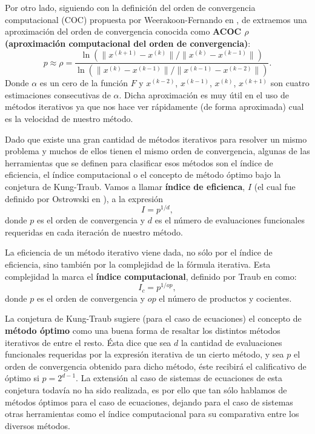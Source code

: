 Por otro lado, siguiendo con la definición del orden de convergencia computacional (COC) propuesta por Weerakoon-Fernando en \cite{weerakoon}, de \cite{CT} extraemos una aproximación del orden de convergencia conocida como \textbf{ACOC $\rho$ (aproximación computacional del orden de convergencia)}:
\begin{equation}\label{acoc}
p \approx \rho = \frac{\ln{(\|x^{(k+1)}-x^{(k)}\|/\|x^{(k)}-x^{(k-1)}\|)}}{\ln{(\|x^{(k)}-x^{(k-1)}\|/\|x^{(k-1)}-x^{(k-2)}\|)}}.
\end{equation}
Donde $\alpha$ es un cero de la función $F$ y $x^{(k-2)}$, $x^{(k-1)}$, $x^{(k)}$, $x^{(k+1)}$ son cuatro estimaciones consecutivas de $\alpha$. Dicha aproximación es muy útil en el uso de métodos iterativos ya que nos hace ver rápidamente (de forma aproximada) cual es la velocidad de nuestro método.

Dado que existe una gran cantidad de métodos iterativos para resolver un mismo problema y muchos de ellos tienen el mismo orden de convergencia, algunas de las herramientas que se definen para clasificar esos métodos son el índice de eficiencia, el índice computacional o el concepto de método óptimo bajo la conjetura de Kung-Traub. Vamos a llamar \textbf{índice de eficienca}, $I$ (el cual fue definido por Ostrowski en \cite{ostrowski}), a la expresión
\begin{equation}
I=p^{1/d},
\end{equation}
donde $p$ es el orden de convergencia y $d$ es el número de evaluaciones funcionales requeridas en cada iteración de nuestro método. 

La eficiencia de un método iterativo viene dada, no sólo por el índice de eficiencia, sino también por la complejidad de la fórmula iterativa. Esta complejidad la marca el \textbf{índice computacional}, definido por Traub en \cite{TR} como:
\begin{equation}
I_c=p^{1/op},
\end{equation}
donde $p$ es el orden de convergencia y $op$ el número de productos y cocientes.

La conjetura de Kung-Traub \cite{KT} sugiere (para el caso de ecuaciones) el concepto de \textbf{método óptimo} como una buena forma de resaltar los distintos métodos iterativos de entre el resto. Ésta dice que sea $d$ la cantidad de evaluaciones funcionales requeridas por la expresión iterativa de un cierto método, y sea $p$ el orden de convergencia obtenido para dicho método, éste recibirá el calificativo de óptimo si $p=2^{d-1}$. La extensión al caso de sistemas de ecuaciones de esta conjetura todavía no ha sido realizada, es por ello que tan sólo hablamos de métodos óptimos para el caso de ecuaciones, dejando para el caso de sistemas otras herramientas como el índice computacional para su comparativa entre los diversos métodos.

